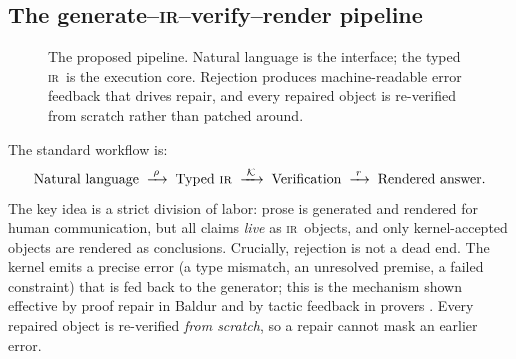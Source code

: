 \documentclass[11pt,a4paper]{article}
\newcommand{\ir}{\textsc{ir}\xspace}
\newcommand{\kernel}{\mathcal{K}}
\newcommand{\reducemap}{\rho}
\newcommand{\rendermap}{r}
\theoremstyle{plain}
\theoremstyle{definition}
\theoremstyle{remark}
\begin{document}
\subsection{The generate--\ir--verify--render pipeline}
\begin{figure}[t]
\centering
{}
\caption{The proposed pipeline. Natural language is the interface; the
typed \ir\ is the execution core. Rejection produces machine-readable
error feedback that drives repair, and every repaired object is
re-verified from scratch rather than patched around.}
\label{fig:pipeline}
\end{figure}

The standard workflow is:
\begin{equation}
\text{Natural language} \;\xrightarrow{\;\reducemap\;}\; \text{Typed \ir}
\;\xrightarrow{\;\kernel\;}\; \text{Verification}
\;\xrightarrow{\;\rendermap\;}\; \text{Rendered answer}.
\end{equation}
The key idea is a strict division of labor: prose is generated and rendered
for human communication, but all claims \emph{live} as \ir\ objects, and
only kernel-accepted objects are rendered as conclusions. Crucially,
rejection is not a dead end. The kernel emits a precise error (a type
mismatch, an unresolved premise, a failed constraint) that is fed back to
the generator; this is the mechanism shown effective by proof repair in
Baldur \citep{first2023baldur} and by tactic feedback in provers
\citep{xin2024deepseekprover}. Every repaired object is re-verified
\emph{from scratch}, so a repair cannot mask an earlier error.
\end{document}
